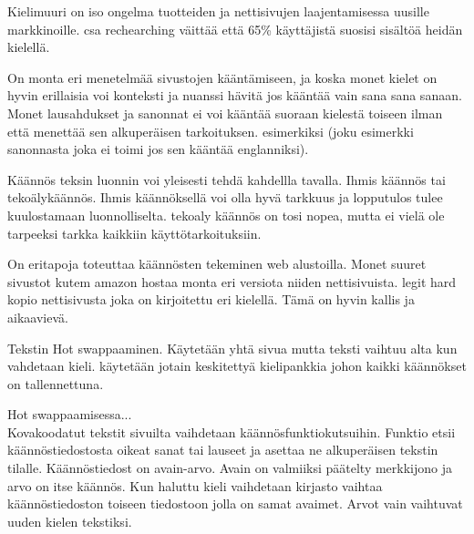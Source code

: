 \documentclass[11pt,a4paper,titlepage,oneside]{article}
\begin{document}







Kielimuuri on iso ongelma tuotteiden ja nettisivujen laajentamisessa uusille markkinoille.
csa rechearching väittää että 65\% käyttäjistä suosisi sisältöä heidän kielellä.
\medskip






On monta eri menetelmää sivustojen kääntämiseen, 
ja koska monet kielet on hyvin erillaisia voi konteksti ja nuanssi hävitä jos kääntää vain sana sana sanaan.
Monet lausahdukset ja sanonnat ei voi kääntää suoraan kielestä toiseen ilman että menettää sen alkuperäisen tarkoituksen.
esimerkiksi (joku esimerkki sanonnasta joka ei toimi jos sen kääntää englanniksi).
\medskip


Käännös teksin luonnin voi yleisesti tehdä kahdellla tavalla. Ihmis käännös tai tekoälykäännös.
Ihmis käännöksellä voi olla hyvä tarkkuus ja lopputulos tulee kuulostamaan luonnolliselta.
tekoaly käännös on tosi nopea, mutta ei vielä ole tarpeeksi tarkka kaikkiin käyttötarkoituksiin.
\medskip






On eritapoja toteuttaa käännösten tekeminen web alustoilla. Monet suuret sivustot kutem amazon \citemissing{} 
hostaa monta eri versiota niiden nettisivuista.
legit hard kopio nettisivusta joka on kirjoitettu eri kielellä. Tämä on hyvin kallis ja aikaavievä.

Tekstin Hot swappaaminen. Käytetään yhtä sivua mutta teksti vaihtuu alta kun vahdetaan kieli. \citemissing{}
käytetään jotain keskitettyä kielipankkia johon kaikki käännökset on tallennettuna.
\medskip


Hot swappaamisessa...\\
Kovakoodatut tekstit sivuilta vaihdetaan käännösfunktiokutsuihin.
Funktio etsii käännöstiedostosta oikeat sanat tai lauseet ja asettaa ne alkuperäisen tekstin tilalle. 
Käännöstiedost on avain-arvo. %
Avain on valmiiksi päätelty merkkijono ja arvo on itse käännös. 
Kun haluttu kieli vaihdetaan kirjasto vaihtaa käännöstiedoston toiseen tiedostoon jolla on samat avaimet. 
Arvot vain vaihtuvat uuden kielen tekstiksi.\citemissing
\medskip
\end{document}
